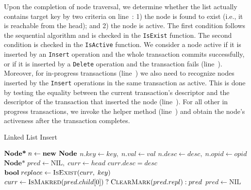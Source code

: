 \documentclass[10pt,conference,compsocconf]{IEEEtran}
\newcommand\NIL{\text{NIL}}
\newcommand\TRUE{\text{\textbf{true}}}
\begin{document}
Upon the completion of node traversal, we determine whether the list actually contains target key by two criteria on line~: 1) the node is found to exist (i.e., it is reachable from the head); and 2) the node is active.
The first condition follows the sequential algorithm and is checked in the \texttt{IsExist} function.
The second condition is checked in the \texttt{IsActive} function.
We consider a node active if it is inserted by an \texttt{Insert} operation and the whole transaction commits successfully, or if it is inserted by a \texttt{Delete} operation and the transaction fails (line~).
Moreover, for in-progress transactions (line~) we also need to recognize nodes inserted by the \texttt{Insert} operations in the same transaction as active. %
This is done by testing the equality between the current transaction's descriptor and the descriptor of the transaction that inserted the node (line~).
For all other in progress transactions, we invoke the helper method (line~) and obtain the node's activeness after the transaction completes. %

\begin{algorithm}[t]
    \caption{Linked List Insert}
    \label{alg:listinsert}
    \begin{algorithmic}[1]
        \State $\textbf{Node*}\; n \gets \text{\textbf{new Node}}$
        \State $n.key \gets key,\;n.val \gets val$
        \State $n.desc \gets desc,\;n.opid \gets opid$
        \State $\textbf{Node*}\; pred \gets \NIL,\;curr \gets head$
        \While{\TRUE} \label{l:listinsertwhile}
        \State {}
         \label{l:listinsertcontain}
        \State \Return $curr.desc = desc$ \label{l:listinsertdesc}
        \EndIf
        \State $\textbf{bool}\; replace \gets \Call{IsExist}{curr,\;key}$ \label{l:listinsertexist}
         \label{l:listinsertreplace}
        \State \Return \TRUE \label{l:listinsertreturn}
        \Else
        \State $curr \gets \textsc{IsMakred}(pred.child[0]) \;?\; \hfill \break  \textsc{ClearMark}(pred.repl) : pred$ \label{l:listinsertpred}
        \State $pred \gets \NIL$ 
        \EndIf
        \EndWhile
        \EndFunction
    \end{algorithmic}
\end{algorithm}
\end{document}
